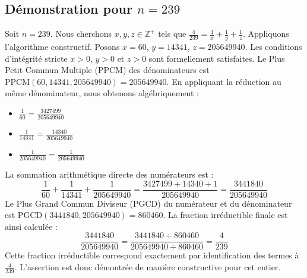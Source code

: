 \documentclass[11pt,a4paper]{article}
\begin{document}
\subsection{Démonstration pour $n = 239$}
Soit $n = 239$. Nous cherchons $x, y, z \in \mathbb{Z}^{+}$ tels que $\frac{4}{239} = \frac{1}{x} + \frac{1}{y} + \frac{1}{z}$.
Appliquons l'algorithme constructif. Posons $x = 60$, $y = 14341$, $z = 205649940$.
Les conditions d'intégrité stricte $x > 0$, $y > 0$ et $z > 0$ sont formellement satisfaites.
Le Plus Petit Commun Multiple (PPCM) des dénominateurs est $\text{PPCM}(60, 14341, 205649940) = 205649940$.
En appliquant la réduction au même dénominateur, nous obtenons algébriquement :
\begin{itemize}
    \item $\frac{1}{60} = \frac{3427499}{205649940}$
    \item $\frac{1}{14341} = \frac{14340}{205649940}$
    \item $\frac{1}{205649940} = \frac{1}{205649940}$
\end{itemize}
La sommation arithmétique directe des numérateurs est :
$$ \frac{1}{60} + \frac{1}{14341} + \frac{1}{205649940} = \frac{3427499 + 14340 + 1}{205649940} = \frac{3441840}{205649940} $$
Le Plus Grand Commun Diviseur (PGCD) du numérateur et du dénominateur est $\text{PGCD}(3441840, 205649940) = 860460$.
La fraction irréductible finale est ainsi calculée :
$$ \frac{3441840}{205649940} = \frac{3441840 \div 860460}{205649940 \div 860460} = \frac{4}{239} $$
Cette fraction irréductible correspond exactement par identification des termes à $\frac{4}{239}$. L'assertion est donc démontrée de manière constructive pour cet entier.
\end{document}

